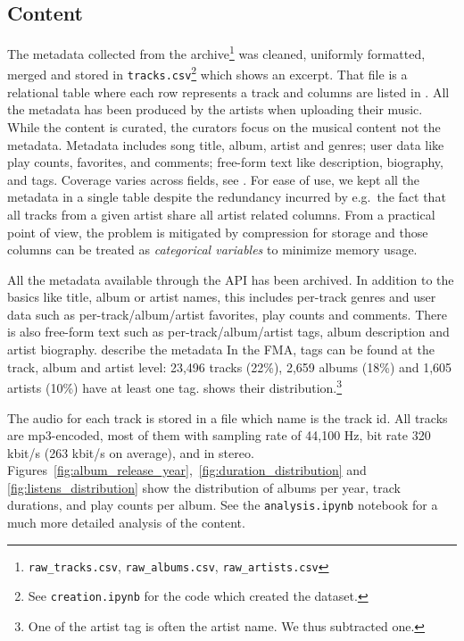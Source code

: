 \documentclass{article}
\newcommand{\todo}[1]{{\color{red} #1}}
\begin{document}
\subsection{Content}

The metadata collected from the archive\footnote{\texttt{raw\_tracks.csv}, \texttt{raw\_albums.csv}, \texttt{raw\_artists.csv}} was cleaned, uniformly formatted, merged and stored in \texttt{tracks.csv}\footnote{\label{creation}See \texttt{creation.ipynb} for the code which created the dataset.} which  shows an excerpt. That file is a relational table where each row represents a track and columns are listed in . All the metadata has been produced by the artists when uploading their music. While the content is curated, the curators focus on the musical content not the metadata.
Metadata includes song title, album, artist and genres; user data like play counts, favorites, and comments; free-form text like description, biography, and tags. Coverage varies across fields, see .
For ease of use, we kept all the metadata in a single table despite the redundancy incurred by e.g.\ the fact that all tracks from a given artist share all artist related columns. From a practical point of view, the problem is mitigated by compression for storage and those columns can be treated as \textit{categorical variables} to minimize memory usage.

All the metadata available through the API has been archived. In addition to the basics like title, album or artist names, this includes per-track genres and user data such as per-track/album/artist favorites, play counts and comments.
There is also free-form text such as per-track/album/artist tags, album description and artist biography. 
\todo{describe the metadata}
In the FMA, tags can be found at the track, album and artist level: 23,496 tracks (22\%), 2,659 albums (18\%) and 1,605 artists (10\%) have at least one tag.  shows their distribution.\footnote{One of the artist tag is often the artist name. We thus subtracted one.}

The audio for each track is stored in a file which name is the track id. All tracks are mp3-encoded, most of them with sampling rate of 44,100 Hz, bit rate 320 kbit/s (263 kbit/s on average), and in stereo. Figures~\ref{fig:album_release_year},~\ref{fig:duration_distribution} and \ref{fig:listens_distribution} show the distribution of albums per year, track durations, and play counts per album.
See the \texttt{analysis.ipynb} notebook for a much more detailed analysis of the content.
\end{document}
